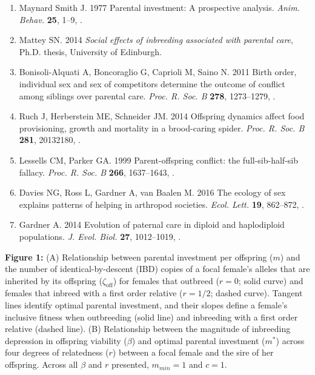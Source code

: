\documentclass[12pt]{article}
\begin{document}
\begin{enumerate}
\item{Maynard Smith J. 1977 {Parental investment: A prospective analysis}.
  \textit{Anim. Behav.} \textbf{25}, 1--9,
  .}

\item{Mattey SN. 2014 \textit{{Social effects of inbreeding associated with
  parental care}}, Ph.D. thesis, University of Edinburgh.}

\item{Bonisoli-Alquati A, Boncoraglio G, Caprioli M, Saino N. 2011 {Birth
  order, individual sex and sex of competitors determine the outcome of
  conflict among siblings over parental care.} \textit{Proc. R. Soc. B}
  \textbf{278}, 1273--1279, .}

\item{Ruch J, Herberstein ME, Schneider JM. 2014 {Offspring dynamics
  affect food provisioning, growth and mortality in a brood-caring spider}.
  \textit{Proc. R. Soc. B} \textbf{281}, 20132180,
  .}

\item{Lessells CM, Parker GA. 1999 {Parent-offspring conflict: the
  full-sib-half-sib fallacy}. \textit{Proc. R. Soc. B}
  \textbf{266}, 1637--1643, .}

\item{Davies NG, Ross L, Gardner A, van Baalen M. 2016 {The ecology of
  sex explains patterns of helping in arthropod societies}. \textit{Ecol.
  Lett.} \textbf{19}, 862--872, .}

\item{Gardner A. 2014 {Evolution of paternal care in diploid and haplodiploid populations.}
  \textit{J. Evol. Biol.} \textbf{27}, 1012–1019, .}

\end{enumerate}

\clearpage

\noindent \textbf{Figure 1:} (A) Relationship between parental investment per offspring ($m$) and the number of identical-by-descent (IBD) copies of a focal female's alleles that are inherited by its offspring ($\zeta_{\textrm{off}}$) for females that outbreed ($r=0$; solid curve) and females that inbreed with a first order relative ($r=1/2$; dashed curve). Tangent lines identify optimal parental investment, and their slopes define a female's inclusive fitness when outbreeding (solid line) and inbreeding with a first order relative (dashed line). (B) Relationship between the magnitude of inbreeding depression in offspring viability ($\beta$) and optimal parental investment ($m^{*}$) across four degrees of relatedness ($r$) between a focal female and the sire of her offspring. Across all $\beta$ and $r$ presented, $m_{min}=1$ and $c=1$. \\
\end{document}
